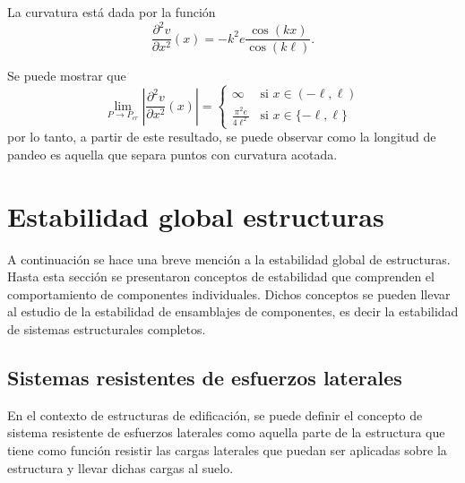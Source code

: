 La curvatura está dada por la función 
\begin{equation}
\frac{\partial^2 v}{\partial x^2}(x) = -k^2 e \frac{\cos(k x)}{\cos(k\ell)}.
\end{equation}


Se puede mostrar que
\begin{equation}
\lim\limits_{P\rightarrow P_{cr}}
\left| \frac{\partial^2 v}{\partial x^2}(x) \right|
 =
\left\{
\begin{array}{lr}
\infty & \text{si } x \in (-\ell,\ell)\\
\displaystyle \frac{\pi^2 e}{4 \ell^2} & \text{si } x \in \{-\ell,\ell\}
\end{array}
\right.
\end{equation}
%
por lo tanto, a partir de este resultado, se puede observar como la longitud de pandeo es aquella que separa puntos con curvatura acotada.





\section{Estabilidad global estructuras}
A continuación se hace una breve mención a la estabilidad global de estructuras. Hasta esta sección se presentaron conceptos de estabilidad que comprenden el comportamiento de componentes individuales. Dichos conceptos se pueden llevar al estudio de la estabilidad de ensamblajes de componentes, es decir la estabilidad de sistemas estructurales completos.

\subsection{Sistemas resistentes de esfuerzos laterales}
En el contexto de estructuras de edificación, se puede definir el concepto de sistema resistente de esfuerzos laterales como aquella parte de la estructura que tiene como función resistir las cargas laterales que puedan ser aplicadas sobre la estructura y llevar dichas cargas al suelo.

